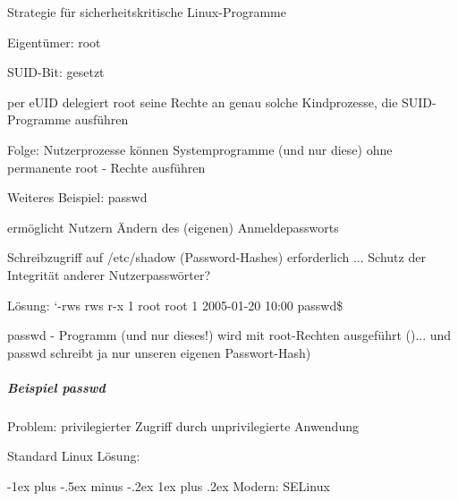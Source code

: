 \documentclass[a4paper]{article}
\makeatletter
\renewcommand{\subsubsection}{\@startsection{subsubsection}{3}{0mm}%
 {-1ex plus -.5ex minus -.2ex}%
 {1ex plus .2ex}%
 {\normalfont\small\bfseries}}
\makeatother
\begin{document}
\begin{multicols}{3}
    Strategie für sicherheitskritische Linux-Programme

    \begin{itemize*}
        \item
        Eigentümer: root
        \item
        SUID-Bit: gesetzt
        \item
        per eUID delegiert root seine Rechte an genau solche Kindprozesse, die
        SUID-Programme ausführen
        \item
        Folge: Nutzerprozesse können Systemprogramme (und nur diese) ohne
        permanente root - Rechte ausführen
    \end{itemize*}

    Weiteres Beispiel: passwd

    \begin{itemize*}
        \item
        ermöglicht Nutzern Ändern des (eigenen) Anmeldepassworts
        \item
        Schreibzugriff auf /etc/shadow (Password-Hashes) erforderlich ...
        Schutz der Integrität anderer Nutzerpasswörter?
        \item
        Lösung: `-rws rws r-x 1 root root 1 2005-01-20 10:00 passwd\$
        \item
        passwd - Programm (und nur dieses!) wird mit root-Rechten ausgeführt
        ()... und passwd schreibt ja nur unseren eigenen Passwort-Hash)
    \end{itemize*}


    \subparagraph{Beispiel passwd}

    \begin{itemize*}
        \item
        Problem: privilegierter Zugriff durch unprivilegierte Anwendung
        \item
        Standard Linux Lösung:
    \end{itemize*}

    \subsubsection{Modern: SELinux}


\end{multicols}
\end{document}
